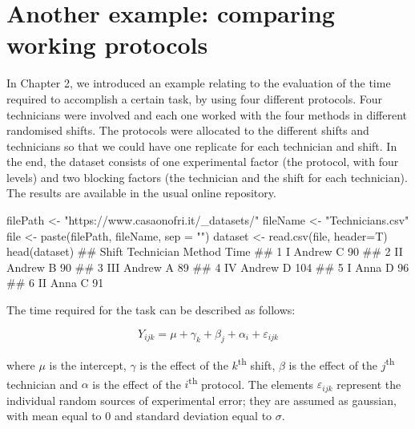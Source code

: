 \documentclass[a4paper,12pt,oneside]{book}
\newenvironment{Shaded}{\begin{snugshade}}{\end{snugshade}}
\newcommand{\StringTok}[1]{#1}
\newcommand{\DocumentationTok}[1]{#1}
\newcommand{\OtherTok}[1]{#1}
\newcommand{\FunctionTok}[1]{#1}
\newcommand{\AttributeTok}[1]{#1}
\newcommand{\NormalTok}[1]{#1}
\begin{document}
\hypertarget{another-example-comparing-working-protocols}{%
\section{Another example: comparing working protocols}\label{another-example-comparing-working-protocols}}

In Chapter 2, we introduced an example relating to the evaluation of the time required to accomplish a certain task, by using four different protocols. Four technicians were involved and each one worked with the four methods in different randomised shifts. The protocols were allocated to the different shifts and technicians so that we could have one replicate for each technician and shift. In the end, the dataset consists of one experimental factor (the protocol, with four levels) and two blocking factors (the technician and the shift for each technician). The results are available in the usual online repository.

\begin{Shaded}
\begin{Highlighting}[]
\NormalTok{filePath }\OtherTok{\textless{}{-}} \StringTok{"https://www.casaonofri.it/\_datasets/"}
\NormalTok{fileName }\OtherTok{\textless{}{-}} \StringTok{"Technicians.csv"}
\NormalTok{file }\OtherTok{\textless{}{-}} \FunctionTok{paste}\NormalTok{(filePath, fileName, }\AttributeTok{sep =} \StringTok{""}\NormalTok{)}
\NormalTok{dataset }\OtherTok{\textless{}{-}} \FunctionTok{read.csv}\NormalTok{(file, }\AttributeTok{header=}\NormalTok{T)}
\FunctionTok{head}\NormalTok{(dataset)}
\DocumentationTok{\#\#   Shift Technician Method Time}
\DocumentationTok{\#\# 1     I     Andrew      C   90}
\DocumentationTok{\#\# 2    II     Andrew      B   90}
\DocumentationTok{\#\# 3   III     Andrew      A   89}
\DocumentationTok{\#\# 4    IV     Andrew      D  104}
\DocumentationTok{\#\# 5     I       Anna      D   96}
\DocumentationTok{\#\# 6    II       Anna      C   91}
\end{Highlighting}
\end{Shaded}

The time required for the task can be described as follows:

\[Y_{ijk} = \mu + \gamma_k + \beta_j + \alpha_i + \varepsilon_{ijk}\]

where \(\mu\) is the intercept, \(\gamma\) is the effect of the \(k\)\textsuperscript{th} shift, \(\beta\) is the effect of the \(j\)\textsuperscript{th} technician and \(\alpha\) is the effect of the \(i\)\textsuperscript{th} protocol. The elements \(\varepsilon_{ijk}\) represent the individual random sources of experimental error; they are assumed as gaussian, with mean equal to 0 and standard deviation equal to \(\sigma\).
\end{document}
